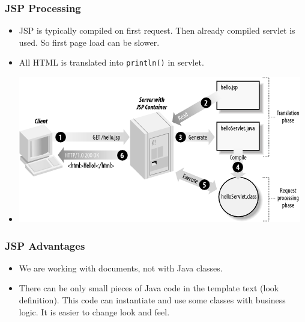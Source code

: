\documentclass[10pt,xcolor=pdflatex]{beamer}
\begin{document}
\begin{frame}[fragile]\frametitle{JSP Processing}
	\begin{itemize}
        \item JSP is typically compiled on first request. Then already compiled servlet is used. So first page load can be slower.
        \item All HTML is translated into \texttt{println()} in servlet.
    	\item [] \begin{center} \includegraphics[scale=0.83]{img/obr3} \end{center}
    \end{itemize}
\end{frame}


\begin{frame}\frametitle{JSP Advantages}
	\begin{itemize}
    	\item We are working with documents, not with Java classes.
        \item There can be only small pieces of Java code in the template text (look definition). This code can instantiate and use some classes with business logic. It is easier to change look and feel.
    \end{itemize}
\end{frame}
\end{document}

